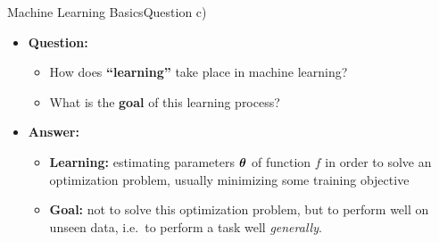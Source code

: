 \documentclass[t]{beamer}
\begin{document}
\begin{frame}{Machine Learning Basics}{Question c)}
    \begin{itemize}
        \item \textbf{Question:}
              \begin{itemize}
                  \item How does \textbf{``learning''} take place in machine
                        learning?
                  \item What is the \textbf{goal} of this learning process?
              \end{itemize}
              \pause
        \item \textbf{Answer:}
              \begin{itemize}
                  \item \textbf{Learning:} estimating parameters ${\boldsymbol{\theta}}$
                        of function $f$ in order to solve an optimization
                        problem, usually minimizing some training objective
                  \item \textbf{Goal:} not to solve this optimization problem,
                        but to perform well on unseen data, i.e.\ to perform a
                        task well \emph{generally}.
              \end{itemize}
    \end{itemize}
\end{frame}
\end{document}
